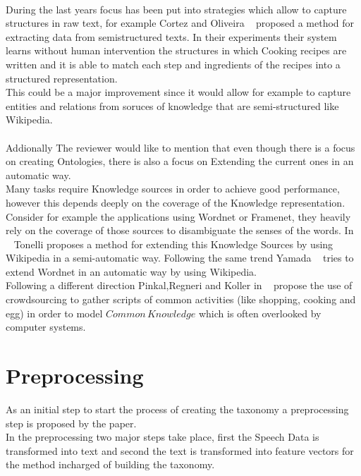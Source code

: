 \documentclass[4pt,a4paper,twocolumn]{article}
\begin{document}
\\
During the last years focus has been put into strategies which allow to capture structures in raw text, for example Cortez and Oliveira ~\cite{Cortez:2011:JUS:1989323.1989380} proposed a method for extracting data from semistructured texts. In their experiments their system learns without human intervention the structures in which Cooking recipes are written and it is able to match each step and ingredients of the recipes into a structured representation.\\
This could be a major improvement since it would allow for example to capture entities and relations from soruces of knowledge that are semi-structured like Wikipedia.\\
\\
Addionally The reviewer would like to mention that even though there is a focus on creating Ontologies, there is also a focus on Extending the current ones in an automatic way.\\
Many tasks require Knowledge sources in order to achieve good performance, however this depends deeply on the coverage of the Knowledge representation. 
Consider for example the applications using Wordnet or Framenet, they heavily rely on the coverage of those sources to disambiguate the senses of the words.
In ~\cite{Tonelli:2013:WWM:2405838.2405917} Tonelli proposes a method for extending this Knowledge Sources by using Wikipedia in a semi-automatic way.
Following the same trend Yamada ~\cite{yamada-EtAl:2011:IJCNLP-2011} tries to extend Wordnet in an automatic way by using Wikipedia.\\
Following a different direction Pinkal,Regneri and Koller  in ~\cite{regneri-koller-pinkal:2010:ACL} propose the use of crowdsourcing to gather scripts of common activities (like shopping, cooking and egg) in order to model $Common\, Knowledge$ which is often overlooked by computer systems.


\section{Preprocessing }
As an initial step to start the process of creating the taxonomy a preprocessing step is proposed by the paper.\\
In the preprocessing two major steps take place, first the Speech Data is transformed into text and second the text is transformed into feature vectors for the method incharged of building the taxonomy.
\end{document}

